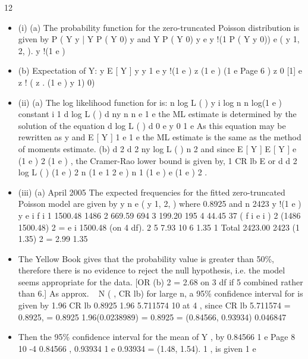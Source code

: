 \documentclass[a4paper,12pt]{article}
\begin{document}
12
\begin{itemize}
\item (i)
(a)
The probability function for the zero-truncated Poisson distribution is given by
P ( Y
y | Y
P ( Y
0)
y and Y
P ( Y 0)
y
e
y !(1 P ( Y
y
0))
e
( y 1, 2, ).
y !(1 e )
\item (b)
Expectation of Y:
y
E [ Y ]
y
y 1
e
y !(1 e )
z
(1 e )
(1 e
Page 6
)
z 0
[1]
e
z !
( z
.
(1 e
)
y 1)
0)%
\item (ii)
(a)
The log likelihood function for
is:
n
log L ( )
y i log
n
n log(1 e )
constant
i 1
d log L ( )
d
ny
n n
e
1 e
the ML estimate is determined by the solution of the equation
d log L ( )
d
0
e
y
0
1 e
As this equation may be rewritten as
y
and E [ Y ]
1 e
1 e
the ML estimate is the same as the method of moments estimate.
(b)
d 2
d
2
ny
log L ( )
n
2
and since E [ Y ] E [ Y ]
e
(1 e ) 2
(1 e )
, the Cramer-Rao lower bound is
given by,
1
CR lb
E
or
d
d
2
log L ( )
(1 e ) 2
n (1 e
1
2
e )
n
1
(1 e )
e
(1 e ) 2
.
\item (iii)
(a)
April 2005
The expected frequencies for the fitted zero-truncated Poisson model are given by
y
n
e
( y 1, 2, ) where
0.8925 and n
2423
y !(1 e )
y
e i
f i
1
1500.48
1486
2
669.59
694
3
199.20
195
4
44.45
37
( f i e i ) 2
(1486 1500.48) 2
=
e i
1500.48
(on 4 df).
2
5
7.93
10
6
1.35
1
Total
2423.00
2423
(1 1.35) 2
= 2.99
1.35
\item 
The Yellow Book gives that the probability value is greater than 50\%, therefore there is no evidence to reject the null hypothesis, i.e. the model seems appropriate for the data.
[OR
(b)
2
= 2.68 on 3 df if
5 combined rather than 6.]
As approx. ~ N ( , CR lb) for large n, a 95\%  confidence interval for
is given by
1.96 CR lb
0.8925 1.96 5.711574 10
at
4
, since CR lb
5.711574
= 0.8925,
= 0.8925 1.96(0.0238989) = 0.8925
= (0.84566, 0.93934)
0.046847
\item 
Then the 95\%  confidence interval for the mean of Y ,
by
0.84566
1 e
Page 8
10 -4
0.84566
,
0.93934
1 e
0.93934
= (1.48, 1.54).
1
, is given
1 e
\end{itemize}
\end{document}
